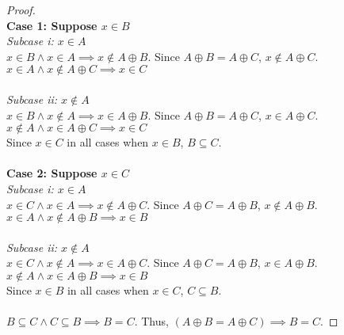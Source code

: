 \documentclass[article,12pt]{article}
\newcommand{\xor}{\oplus}
\begin{document}
\begin{proof} 
    \ \\
    \textbf{Case 1: Suppose $x \in B$} \\
    \textit{Subcase i: $x \in A$} \\
    $x \in B \land x \in A \implies x \notin A \xor B$. Since $A \xor B = A \xor C$, $x \notin A \xor C$. \\
    $x \in A \land x \notin A \xor C \implies x \in C$\\
    \\
    \textit{Subcase ii: $x \notin A$} \\
    $x \in B \land x \notin A \implies x \in A \xor B$. Since $A \xor B = A \xor C$, $x \in A \xor C$. \\
    $x \notin A \land x \in A \xor C \implies x \in C$ \\

    Since $x \in C$ in all cases when $x \in B$, $B \subseteq C$.\\
    \\
    \textbf{Case 2: Suppose $x \in C$} \\
    \textit{Subcase i: $x \in A$} \\
    $x \in C \land x \in A \implies x \notin A \xor C$. Since $A \xor C = A \xor B$, $x \notin A \xor B$. \\
    $x \in A \land x \notin A \xor B \implies x \in B$\\
    \\
    \textit{Subcase ii: $x \notin A$} \\
    $x \in C \land x \notin A \implies x \in A \xor C$. Since $A \xor C = A \xor B$, $x \in A \xor B$. \\
    $x \notin A \land x \in A \xor B \implies x \in B$ \\

    Since $x \in B$ in all cases when $x \in C$, $C \subseteq B$.\\
    \\
    $B \subseteq C \land C \subseteq B \implies B = C$. Thus, $(A \xor B = A \xor C) \implies B=C$. 
\end{proof}
\end{document}
